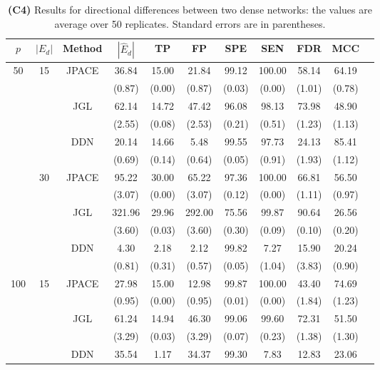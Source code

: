 \documentclass[useAMS,usenatbib,referee]{bio}
\begin{document}
{{\begin{table}[htb!]
\caption{{\bf (C4)} Results for directional differences between two dense
networks: the values are average over 50 replicates.
Standard errors are in parentheses.}
\medskip
\centering
{ %
\begin{tabular}{||c|c|c||c|c|c|c|c|c|c||c} \cline{1-10}
$p$  &  $|E_d|$  & Method & $|\hat{E}_d|$ & TP & FP & SPE & SEN & FDR & MCC \\ \hline 
\multirow{12}{*}{50}  &\multirow{6}{*}{15}  & \multirow{2}{*}{JPACE} &36.84 & 15.00 & 21.84 & 99.12 & 100.00 & 58.14 & 64.19 \\ 
& & & (0.87) & (0.00) & (0.87) & (0.03) & (0.00) & (1.01) & (0.78) \\ \cline{3-10} 
& & \multirow{2}{*}{JGL} & 62.14 & 14.72 & 47.42 & 96.08 & 98.13 & 73.98 & 48.90 \\ 
 & & & (2.55) & (0.08) & (2.53) & (0.21) & (0.51) & (1.23) & (1.13) \\ \cline{3-10} 
& & \multirow{2}{*}{DDN} & 20.14 & 14.66 & 5.48 & 99.55 & 97.73 & 24.13 & 85.41 \\ 
 & & & (0.69) & (0.14) & (0.64) & (0.05) & (0.91) & (1.93) & (1.12) \\\cline{2-10} 
  &\multirow{6}{*}{30}  & \multirow{2}{*}{JPACE} &95.22 & 30.00 & 65.22 & 97.36 & 100.00 & 66.81 & 56.50 \\ 
& & & (3.07) & (0.00) & (3.07) & (0.12) & (0.00) & (1.11) & (0.97) \\ \cline{3-10} 
& & \multirow{2}{*}{JGL} & 321.96 & 29.96 & 292.00 & 75.56 & 99.87 & 90.64 & 26.56 \\ 
 & & & (3.60) & (0.03) & (3.60) & (0.30) & (0.09) & (0.10) & (0.20) \\ \cline{3-10} 
& & \multirow{2}{*}{DDN} & 4.30 & 2.18 & 2.12 & 99.82 & 7.27 & 15.90 & 20.24 \\ 
 & & & (0.81) & (0.31) & (0.57) & (0.05) & (1.04) & (3.83) & (0.90) \\\cline{1-10} 
\multirow{12}{*}{100}  &\multirow{6}{*}{15}  & \multirow{2}{*}{JPACE} &27.98 & 15.00 & 12.98 & 99.87 & 100.00 & 43.40 & 74.69 \\ 
& & & (0.95) & (0.00) & (0.95) & (0.01) & (0.00) & (1.84) & (1.23) \\ \cline{3-10} 
& & \multirow{2}{*}{JGL} & 61.24 & 14.94 & 46.30 & 99.06 & 99.60 & 72.31 & 51.50 \\ 
 & & & (3.29) & (0.03) & (3.29) & (0.07) & (0.23) & (1.38) & (1.30) \\ \cline{3-10} 
& & \multirow{2}{*}{DDN} & 35.54 & 1.17 & 34.37 & 99.30 & 7.83 & 12.83 & 23.06 \\ 

\end{tabular}}
\end{table}}}
\end{document}
